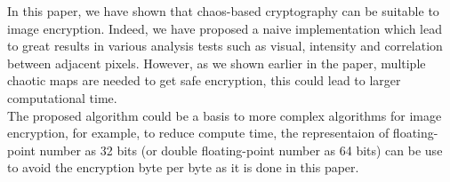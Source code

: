 In this paper, we have shown that chaos-based cryptography can be suitable to image encryption.
Indeed, we have proposed a naive implementation which lead to great results in various analysis tests such as visual, intensity and correlation between adjacent pixels. 
However, as we shown earlier in the paper, multiple chaotic maps are needed to get safe encryption, this could lead to larger computational time. \\

The proposed algorithm could be a basis to more complex algorithms for image encryption, for example, to reduce compute time, the representaion of floating-point number as 32 bits (or double floating-point number as 64 bits) can be use to avoid the encryption byte per byte as it is done in this paper.
